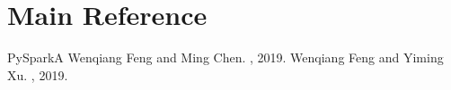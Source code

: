 \documentclass[letterpaper,12pt,english]{sphinxmanual}
\begin{document}
\chapter{Main Reference}
\label{\detokenize{reference:main-reference}}\label{\detokenize{reference:reference}}\label{\detokenize{reference::doc}}
\begin{sphinxthebibliography}{PySparkA}
Wenqiang Feng and Ming Chen. , 2019.
Wenqiang Feng and Yiming Xu. , 2019.
\end{sphinxthebibliography}



\renewcommand{\indexname}{Index}
\printindex
\end{document}
